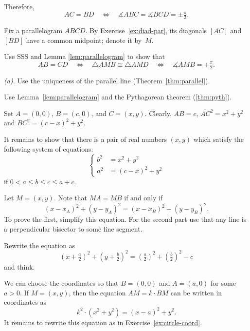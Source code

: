 Therefore, 
\[AC=BD
\quad
\iff
\quad 
\measuredangle ABC
=\measuredangle BCD
=\pm\tfrac\pi2.\]

Fix a parallelogram $ABCD$.
By Exercise~\ref{ex:diad-par},
its diagonals $[AC]$ and $[BD]$ have a common midpoint; denote it by~$M$.

Use SSS and Lemma \ref{lem:parallelogram} to show that
\[AB=CD
\quad
\iff
\quad
\triangle AMB
\cong
\triangle AMD
\quad
\iff
\quad
\measuredangle AMB
=
\pm\tfrac\pi2.\]

 \textit{(a).} Use the uniqueness of the parallel line (Theorem~\ref{thm:parallel}).

 Use Lemma~\ref{lem:parallelogram} and the Pythagorean theorem (\ref{thm:pyth}).

Set $A=(0,0)$, $B=(c,0)$, and $C=(x,y)$.
Clearly, $AB=c$,
$AC^2=x^2+y^2$ and $BC^2=(c-x)^2+y^2$.

It remains to show that there is a pair of real numbers $(x,y)$ 
which satisfy the following system of equations:
$$
\left\{
\begin{aligned}
b^2&=x^2+y^2
\\
a^2&=(c-x)^2+y^2
\end{aligned}
\right.
$$
if $0<a\le b\le c\le a+c$.




 Let $M=(x,y)$. Note that $MA=MB$ if and only if
\[(x-x_A)^2+(y-y_A)^2=(x-x_B)^2+(y-y_B)^2.\]
To prove the first, simplify this equation.
For the second part use that any line is a perpendicular bisector to some line segment.

 Rewrite the equation as 
\[(x+\tfrac a2)^2+(y+\tfrac b2)^2=(\tfrac a2)^2+(\tfrac b2)^2-c\]
and think.

We can choose the coordinates so that $B=(0,0)$ and $A=(a,0)$ for some $a>0$.
If $M=(x,y)$, then the equation $AM=k\cdot BM$ can be written in coordinates as 
\[k^2\cdot(x^2+y^2)=(x-a)^2+y^2.\]
It remains to rewrite this equation as in Exercise~\ref{ex:circle-coord}.


\setcounter{eqtn}{0}

